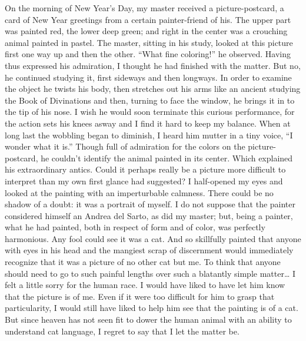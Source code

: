 \documentclass{book}
\begin{document}
On the morning of New Year's Day, my master received a picture-postcard,
a card of New Year greetings from a certain painter-friend of his. The
upper part was painted red, the lower deep green; and right in the
center was a crouching animal painted in pastel. The master, sitting in
his study, looked at this picture first one way up and then the other.
``What fine coloring!'' he observed. Having thus expressed his
admiration, I thought he had finished with the matter. But no, he
continued studying it, first sideways and then longways. In order to
examine the object he twists his body, then stretches out his arms like
an ancient studying the Book of Divinations and then, turning to face
the window, he brings it in to the tip of his nose. I wish he would soon
terminate this curious performance, for the action sets his knees asway
and I find it hard to keep my balance. When at long last the wobbling
began to diminish, I heard him mutter in a tiny voice, ``I wonder what
it is.'' Though full of admiration for the colors on the
picture-postcard, he couldn't identify the animal painted in its center.
Which explained his extraordinary antics. Could it perhaps really be a
picture more difficult to interpret than my own first glance had
suggested? I half-opened my eyes and looked at the painting with an
imperturbable calmness. There could be no shadow of a doubt: it was a
portrait of myself. I do not suppose that the painter considered himself
an Andrea del Sarto, as did my master; but, being a painter, what he had
painted, both in respect of form and of color, was perfectly harmonious.
Any fool could see it was a cat. And so skillfully painted that anyone
with eyes in his head and the mangiest scrap of discernment would
immediately recognize that it was a picture of no other cat but me. To
think that anyone should need to go to such painful lengths over such a
blatantly simple matter\ldots{} I felt a little sorry for the human
race. I would have liked to have let him know that the picture is of me.
Even if it were too difficult for him to grasp that particularity, I
would still have liked to help him see that the painting is of a cat.
But since heaven has not seen fit to dower the human animal with an
ability to understand cat language, I regret to say that I let the
matter be.
\end{document}
